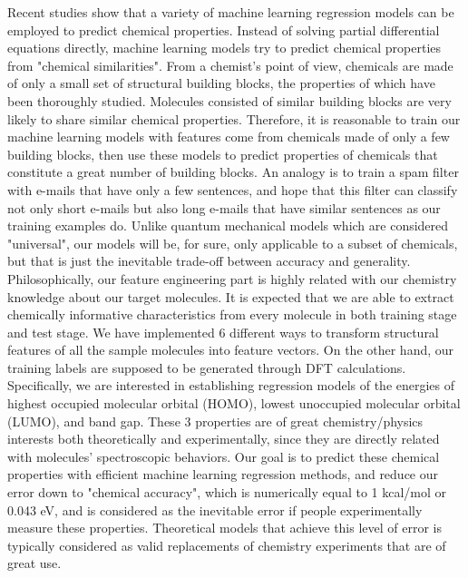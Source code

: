 Recent studies show that a variety of machine learning regression models can be employed to predict chemical properties. Instead of solving partial differential equations directly, machine learning models try to predict chemical properties from "chemical similarities". From a chemist's point of view, chemicals are made of only a small set of structural building blocks, the properties of which have been thoroughly studied. Molecules consisted of similar building blocks are very likely to share similar chemical properties. Therefore, it is reasonable to train our machine learning models with features come from chemicals made of only a few building blocks, then use these models to predict properties of chemicals that constitute a great number of building blocks. An analogy is to train a spam filter with e-mails that have only a few sentences, and hope that this filter can classify not only short e-mails but also long e-mails that have similar sentences as our training examples do. Unlike quantum mechanical models which are considered "universal", our models will be, for sure, only applicable to a subset of chemicals, but that is just the inevitable trade-off between accuracy and generality. \\

Philosophically, our feature engineering part is highly related with our chemistry knowledge about our target molecules. It is expected that we are able to extract chemically informative characteristics from every molecule in both training stage and test stage. We have implemented 6 different ways to transform structural features of all the sample molecules into feature vectors. On the other hand, our training labels are supposed to be generated through DFT calculations. Specifically, we are interested in establishing regression models of the energies of highest occupied molecular orbital (HOMO), lowest unoccupied molecular orbital (LUMO), and band gap. These 3 properties are of great chemistry/physics interests both theoretically and experimentally, since they are directly related with molecules' spectroscopic behaviors. Our goal is to predict these chemical properties with efficient machine learning regression methods, and reduce our error down to "chemical accuracy", which is numerically equal to 1 kcal/mol or 0.043 eV, and is considered as the inevitable error if people experimentally measure these properties. Theoretical models that achieve this level of error is typically considered as valid replacements of chemistry experiments that are of great use. \\

